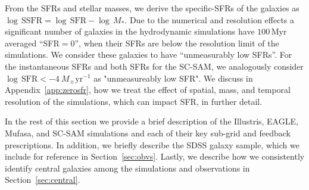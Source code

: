 \documentclass[tighten, preprint]{aastex62}
\begin{document}
From the SFRs and stellar masses, we derive the specific-SFRs of the galaxies 
as $\log\,\mathrm{SSFR} = \log\,\mathrm{SFR} - \log\,M_*$. Due to the numerical 
and resolution effects a significant number of galaxies in the hydrodynamic 
simulations have $100\,\mathrm{Myr}$ averaged ``SFR$=0$'', when their SFRs 
are below the resolution limit of the simulations. We consider these galaxies 
to have ``unmeasurably low SFRs''. For the instantaneous SFRs and both SFRs for 
the SC-SAM, we analogously consider $\log\,\mathrm{SFR} < -4\ M_{\sun} \mathrm{yr}^{-1}$ 
as "unmeasureably low SFR". We discuss in Appendix~\ref{app:zerosfr}, how 
we treat the effect of spatial, mass, and temporal resolution of the simulations, 
which can impact SFR, in further detail.

In the rest of this section we provide a brief description of the 
Illustris, EAGLE, {\sc Mufasa}, and SC-SAM simulations and each 
of their key sub-grid and feedback prescriptions. In addition, we briefly 
describe the
SDSS galaxy sample, which we include for reference in Section~\ref{sec:obvs}.
Lastly, we describe how we consistently identify central galaxies among 
the simulations and observations in Section~\ref{sec:central}. 



\end{document}
